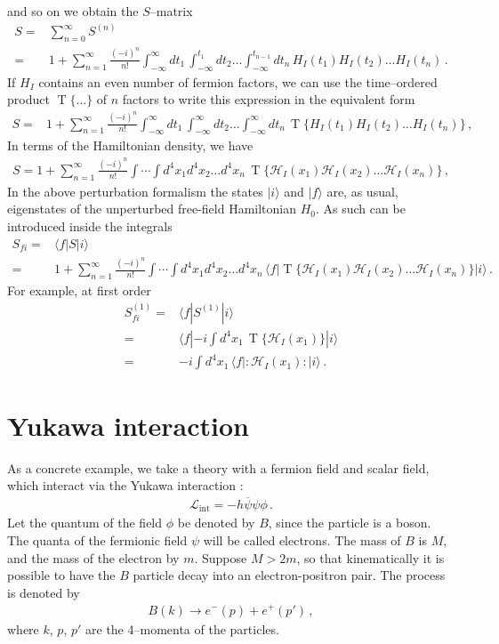 and so on we obtain the $S$--matrix
\begin{align}
  S=&\sum_{n=0}^\infty S^{(n)}\nonumber\\
  =&1+\sum_{n=1}^\infty\frac{(-i)^n}{n!}\int_{-\infty}^{\infty}d t_1\,\int_{-\infty}^{t_1} d t_2\ldots\int_{-\infty}^{t_{n-1}}d t_n\,{H}_I(t_1){H}_I(t_2)\ldots{H}_I(t_n)\,.
\end{align}
If $H_I$ contains an even number of fermion factors, we can use the time--ordered product $\operatorname{T}\{\ldots\}$ of $n$ factors to write this expression in the equivalent form
\begin{align}
   S=&1+\sum_{n=1}^\infty\frac{(-i)^n}{n!}\int_{-\infty}^{\infty}d t_1\,\int_{-\infty}^{\infty} d t_2\ldots\int_{-\infty}^{\infty}d t_n\,\operatorname{T}\{{H}_I(t_1){H}_I(t_2)\ldots{H}_I(t_n)\}\,, 
\end{align}
In terms of the Hamiltonian density, we have
\begin{align}
  S=1+\sum_{n=1}^\infty\frac{(-i)^n}{n!}\int\cdots\int d^4x_1 d^4x_2\ldots d^4x_n\,\operatorname{T}\{\mathcal{H}_I(x_1)\mathcal{H}_I(x_2)\ldots\mathcal{H}_I(x_n)\}\,, 
\end{align}
In the above perturbation formalism the states $|i\rangle$ and $|f\rangle$ are, as usual, eigenstates of the unperturbed free-field Hamiltonian $H_0$. As such can be introduced inside the integrals
\begin{align}
  S_{f i}=&\langle f|S|i\rangle\nonumber\\
  =&1+\sum_{n=1}^\infty\frac{(-i)^n}{n!}\int\cdots\int d^4x_1 d^4x_2\ldots d^4x_n\,\langle f|\operatorname{T}\{\mathcal{H}_I(x_1)\mathcal{H}_I(x_2)\ldots\mathcal{H}_I(x_n)\}|i\rangle\,.
\end{align}
For example, at first order
\begin{align}
  \label{eq:96}
  S_{fi}^{(1)}=&\langle f|S^{(1)}|i\rangle\nonumber\\
  =&\langle f|-i\int d^4x_1\,\operatorname{T}\{\mathcal{H}_I(x_1)\}|i\rangle\nonumber\\
  =&-i\int d^4x_1\,\langle f|:\mathcal{H}_I(x_1):|i\rangle\,.
\end{align}

\section{Yukawa interaction}
\label{sec:feynman-diagrams}
As a concrete example, we take a theory with a fermion field and scalar field, which interact via the Yukawa interaction \cite{Lahiri:2005sm}:
\begin{align}
  \mathcal{L}_{\text{int}}=-h \overline{\psi}\psi\phi\,.
\end{align}
Let the quantum of the field $\phi$ be denoted by $B$, since the particle is a boson. The quanta of the fermionic field $\psi$ will be called electrons. The mass of $B$ is $M$, and the mass of the electron by $m$. Suppose $M\gt 2m$,  so that kinematically it is possible to have the $B$ particle decay into an electron-positron pair. The process is denoted by
\begin{align}
  B(k)\to e^-(p)+e^+(p')\,,
\end{align}
where $k$, $p$, $p'$ are the 4--momenta of the particles.

